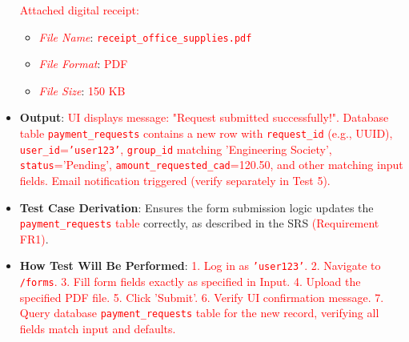 \documentclass[12pt, titlepage]{article}
\begin{document}
\begin{itemize}
\begin{itemize}
        \end{itemize}
        \textcolor{red}{Attached digital receipt:}
        \begin{itemize}
            \item \textit{\textcolor{red}{File Name}}: \textcolor{red}{\texttt{receipt\_office\_supplies.pdf}}
            \item \textit{\textcolor{red}{File Format}}: \textcolor{red}{PDF}
            \item \textit{\textcolor{red}{File Size}}: \textcolor{red}{150 KB}
        \end{itemize}
    \item \textbf{Output}: \textcolor{red}{UI displays message: "Request submitted successfully!". Database table \texttt{payment\_requests} contains a new row with \texttt{request\_id} (e.g., UUID), \texttt{user\_id}=\texttt{'user123'}, \texttt{group\_id} matching 'Engineering Society', \texttt{status}='Pending', \texttt{amount\_requested\_cad}=120.50, and other matching input fields. Email notification triggered (verify separately in Test 5).}
    \item \textbf{Test Case Derivation}: Ensures the form submission logic updates the \textcolor{red}{\texttt{payment\_requests} table} correctly, as described in the SRS \textcolor{red}{(Requirement FR1)}.
    \item \textbf{How Test Will Be Performed}: \textcolor{red}{1. Log in as \texttt{'user123'}. 2. Navigate to \texttt{/forms}. 3. Fill form fields exactly as specified in Input. 4. Upload the specified PDF file. 5. Click 'Submit'. 6. Verify UI confirmation message. 7. Query database \texttt{payment\_requests} table for the new record, verifying all fields match input and defaults.}
\end{itemize}
\end{document}
